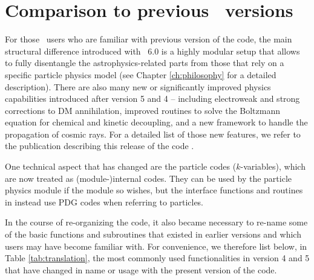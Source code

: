 \chapter{Comparison to previous \ds\ versions}
\label{ch:translation}

For those \ds\ users who are familiar with previous version of the code, the main 
structural difference introduced with \ds\ 6.0 is a highly modular setup that allows to 
fully disentangle the astrophysics-related parts from those that rely on a specific particle
physics model (see Chapter 
\ref{ch:philosophy} for a detailed description). There are also many new or significantly 
improved physics capabilities introduced after version 5 and 4 \cite{ds4} -- including 
electroweak and strong corrections to DM annihilation, improved routines to solve
the Boltzmann equation for chemical and kinetic decoupling, and a new framework to handle 
the propagation of cosmic rays. For a detailed list of those new features, we refer to the 
publication describing this release of the code \cite{ds6}.


One technical aspect that has changed are the particle codes ($k$-variables), which are 
now treated as (module-)internal codes. They can be used by the particle physics module if the 
module so wishes, but the interface functions and routines in  instead 
use PDG codes when referring to particles.

In the course of re-organizing the code, it also became necessary to re-name some of the 
basic functions and subroutines that existed in earlier versions and which users may have
become familiar with. For convenience, we therefore list below, in Table \ref{tab:translation},
 the most commonly used functionalities in version 4 and 5 that have changed in name or 
 usage with the present version of the code.


